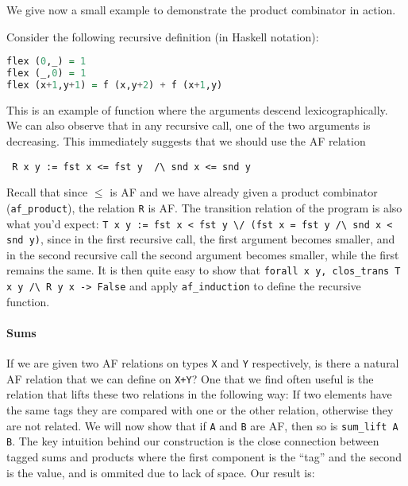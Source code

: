 \documentclass{llncs}
\begin{document}
We give now a small example to demonstrate the product combinator in action. 
\vspace{5pt}\begin{example}
Consider the following recursive definition (in Haskell notation):
\begin{lstlisting}[language=hs]
flex (0,_) = 1
flex (_,0) = 1 
flex (x+1,y+1) = f (x,y+2) + f (x+1,y) 
\end{lstlisting}
This is an example of function where the arguments descend lexicographically. We can 
also observe that in any recursive call, one of the two arguments is decreasing. This 
immediately suggests that we should use the AF 
relation 
\begin{center} 
\lstinline| R x y := fst x <= fst y  /\ snd x <= snd y|
\end{center}
Recall that since $\leq$ is AF and we have already given a product combinator (\lstinline|af_product|), 
the relation \lstinline|R| is AF. The transition relation of the program is also what you'd expect:
\lstinline|T x y := fst x < fst y \/ (fst x = fst y /\ snd x < snd y)|, since in the first recursive call, 
the first argument becomes smaller, and in the second recursive call the second argument becomes smaller, while the first remains the same.
It is then quite easy to show that
\lstinline|forall x y, clos_trans T x y /\ R y x -> False| and 
apply \lstinline|af_induction| to define the recursive function.
\end{example}

\paragraph{Sums} 
If we are given two AF relations on types \lstinline|X| and \lstinline|Y| respectively, 
is there a natural AF relation that we can define on \lstinline|X+Y|? One that we find 
often useful is the relation that lifts these two relations in the following way:
If two elements have the same tags they are compared with one or the other relation, 
otherwise they are not related. We will now show that if \lstinline|A| and \lstinline|B|
are AF, then so is \lstinline|sum_lift A B|. The key intuition behind our construction is
the close connection between tagged sums and products where the first component is the 
``tag'' and the second is the value, and is ommited due to lack of space. Our result is:
\end{document}
